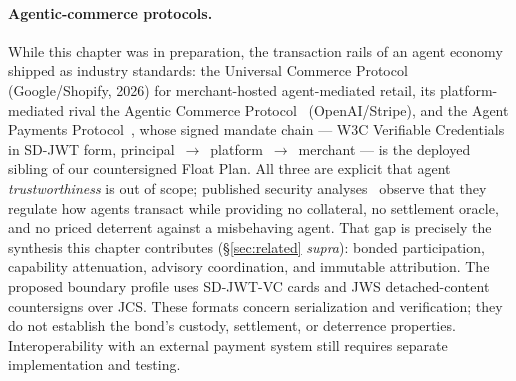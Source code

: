 \documentclass[11pt,a4paper]{article}
\theoremstyle{definition}
\theoremstyle{remark}
\begin{document}
\paragraph{Agentic-commerce protocols.} While this chapter was in preparation, the transaction rails of an agent economy shipped as industry standards: the Universal Commerce Protocol~ (Google/Shopify, 2026) for merchant-hosted agent-mediated retail, its platform-mediated rival the Agentic Commerce Protocol~ (OpenAI/Stripe), and the Agent Payments Protocol~, whose signed mandate chain --- W3C Verifiable Credentials in SD-JWT form, principal~$\to$~platform~$\to$~merchant --- is the deployed sibling of our countersigned Float Plan. All three are explicit that agent \emph{trustworthiness} is out of scope; published security analyses~ observe that they regulate how agents transact while providing no collateral, no settlement oracle, and no priced deterrent against a misbehaving agent. That gap is precisely the synthesis this chapter contributes (\S\ref{sec:related} \emph{supra}): bonded participation, capability attenuation, advisory coordination, and immutable attribution. The proposed boundary profile uses SD-JWT-VC cards and JWS detached-content countersigns over JCS. These formats concern serialization and verification; they do not establish the bond's custody, settlement, or deterrence properties. Interoperability with an external payment system still requires separate implementation and testing.
\end{document}
